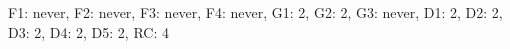 F1: never, F2: never, F3: never, F4: never, G1: 2, G2: 2, G3: never, D1: 2, D2: 2, D3: 2, D4: 2, D5: 2, RC: 4